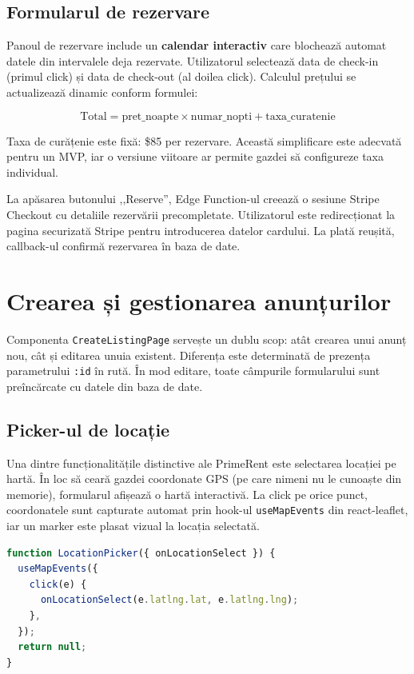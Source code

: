 \documentclass[12pt,a4paper,oneside]{report}
\begin{document}
\subsection{Formularul de rezervare}

Panoul de rezervare include un \textbf{calendar interactiv} care blochează automat datele din intervalele deja rezervate. Utilizatorul selectează data de check-in (primul click) și data de check-out (al doilea click). Calculul prețului se actualizează dinamic conform formulei:

$$\text{Total} = \text{pret\_noapte} \times \text{numar\_nopti} + \text{taxa\_curatenie}$$

Taxa de curățenie este fixă: \$85 per rezervare. Această simplificare este adecvată pentru un MVP, iar o versiune viitoare ar permite gazdei să configureze taxa individual.

La apăsarea butonului ,,Reserve'', Edge Function-ul creează o sesiune Stripe Checkout cu detaliile rezervării precompletate. Utilizatorul este redirecționat la pagina securizată Stripe pentru introducerea datelor cardului. La plată reușită, callback-ul confirmă rezervarea în baza de date.


\section{Crearea și gestionarea anunțurilor}

Componenta \texttt{CreateListingPage} servește un dublu scop: atât crearea unui anunț nou, cât și editarea unuia existent. Diferența este determinată de prezența parametrului \texttt{:id} în rută. În mod editare, toate câmpurile formularului sunt preîncărcate cu datele din baza de date.

\subsection{Picker-ul de locație}

Una dintre funcționalitățile distinctive ale PrimeRent este selectarea locației pe hartă. În loc să ceară gazdei coordonate GPS (pe care nimeni nu le cunoaște din memorie), formularul afișează o hartă interactivă. La click pe orice punct, coordonatele sunt capturate automat prin hook-ul \texttt{useMapEvents} din react-leaflet, iar un marker este plasat vizual la locația selectată.

\begin{lstlisting}[language=TypeScript, caption={Componenta LocationPicker pentru selectarea locației}]
function LocationPicker({ onLocationSelect }) {
  useMapEvents({
    click(e) {
      onLocationSelect(e.latlng.lat, e.latlng.lng);
    },
  });
  return null;
}
\end{lstlisting}
\end{document}
